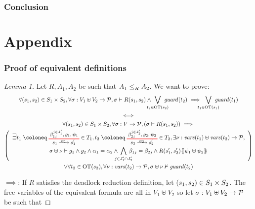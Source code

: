 \documentclass{article}
\begin{document}
\section{Conclusion}

\pagebreak



\pagebreak
\appendix
\part*{Appendix}

\section{Proof of equivalent definitions}\label{apx:lemeqd}
\begin{proof}[Lemma 1] %
Let \(R, A_1, A_2\) be such that \(\wrel{A_1}{A_2}{R}\).
We want to prove:
\begin{gather*}
	\forall \mpar{s_1, s_2} \in S_1 \times S_2, \forall \sigma: V_1 \uplus V_2 \to \values, \sigma \vdash R\mpar{s_1, s_2} \wedge \bigvee_\subbox{t_2 \in \fOT{s_2}} \fguard{t_2} \implies \bigvee_\subbox{t_1 \in \fOT{s_1}} \fguard{t_1} \\
\iff \\
	\forall \mpar{s_1, s_2} \in S_1 \times S_2, \forall \sigma: V \to \values, \mpar{\sigma \vdash R\mpar{s_1, s_2}} \implies \\
	\mpar{\everymath{\displaystyle}\begin{array}{c}
		\bigsymb{\exists} t_1 \defobject \OTx{1}{}{1}{1} \in T_1, t_2 \defobject \OTx{2}{}{2}{2} \in T_2, \exists \nu: \fvars{t_1} \uplus \fvars{t_2} \to \values, \\
		\sigma \uplus \nu \vdash g_1 \wedge g_2 \wedge \alpha_1 = \alpha_2 \wedge \bigwedge_\subbox{j \in J'_1 \cap J'_2} \beta_{1j} = \beta_{2j} \wedge R\mpar{s'_1, s'_2}\psubst{\psi_1 \uplus \psi_2}
	\end{array}} \\
	\vee \forall t_2 \in \fOT{s_2}, \forall \nu: \fvars{t_2} \to \values, \sigma \uplus \nu \nvdash \fguard{t_2}
\end{gather*}
\item[\(\implies\):] If \(R\) satisfies the deadlock reduction definition, let \(\mpar{s_1, s_2} \in S_1 \times S_2\).
	The free variables of the equivalent formula are all in \(V_1 \uplus V_2\) so let \(\sigma: V_1 \uplus V_2 \to \values\) be such that

\end{proof}
\end{document}

